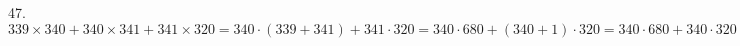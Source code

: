 47. $339 \times 340 + 340 \times 341 + 341 \times 320=
340\cdot(339+341)+341\cdot320=340\cdot680+(340+1)\cdot320=
340\cdot680+340\cdot320+1\cdot320=340\cdot(680+320)+320=
340\cdot1000+320=340320.$\\
